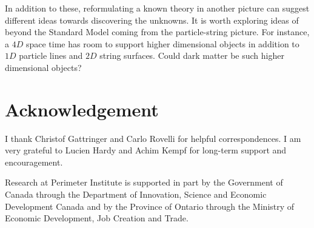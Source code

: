 \documentclass[12pt]{article}
\theoremstyle{definition}
\begin{document}
In addition to these, reformulating a known theory in another picture can suggest different ideas towards discovering the unknowns. It is worth exploring ideas of beyond the Standard Model coming from the particle-string picture. For instance, a $4D$ space time has room to support higher dimensional objects in addition to $1D$ particle lines and $2D$ string surfaces. Could dark matter be such higher dimensional objects?


\section*{Acknowledgement}

I thank Christof Gattringer and Carlo Rovelli for helpful correspondences. I am very grateful to Lucien Hardy and Achim Kempf for long-term support and encouragement. 

Research at Perimeter Institute is supported in part by the Government of Canada through the Department of Innovation, Science and Economic Development Canada and by the Province of Ontario through the Ministry of Economic Development, Job Creation and Trade.



\end{document}
